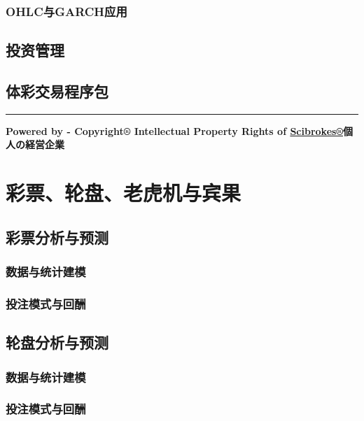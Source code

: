 \documentclass[]{book}
\begin{document}
\subsection{OHLC与GARCH应用}\label{ohlcgarch}

\section{投资管理}\label{-1}

\section{体彩交易程序包}

\begin{center}\rule{0.5\linewidth}{\linethickness}\end{center}

\textbf{Powered by - Copyright® Intellectual Property Rights of
\href{http://www.scibrokes.com}{Scibrokes®}個人の経営企業}

\chapter{彩票、轮盘、老虎机与宾果}\label{lottery}

\section{彩票分析与预测}

\subsection{数据与统计建模}

\subsection{投注模式与回酬}

\section{轮盘分析与预测}

\subsection{数据与统计建模}\label{-1}

\subsection{投注模式与回酬}\label{-1}
\end{document}
